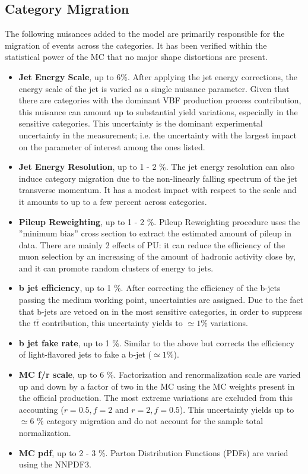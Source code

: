 \subsection{Category Migration}
The following nuisances added to the model are primarily responsible for the migration of events across the categories. It has been verified within the statistical power of the MC that no major shape distortions are present.
\begin{itemize}
    \item {\bf Jet Energy Scale}, up to 6\%. After applying the jet energy corrections, the energy scale of the jet is varied as a single nuisance parameter.
    Given that there are categories with the dominant VBF production process contribution, this nuisance can amount up to substantial yield variations, especially in the sensitive categories. This uncertainty is the dominant experimental uncertainty in the measurement; i.e. the uncertainty with the largest impact on the parameter of interest among the ones listed.
    \item {\bf Jet Energy Resolution}, up to 1 - 2 \%. The jet energy resolution can also induce category migration due to the non-linearly falling spectrum of the jet transverse momentum. It has a modest impact with respect to the scale and it amounts to up to a few percent across categories.
    \item {\bf Pileup Reweighting}, up to 1 - 2 \%. Pileup Reweighting procedure uses the ''minimum bias'' cross section to extract the estimated amount of pileup in data. There are mainly 2 effects of PU: it can reduce the efficiency of the muon selection by an increasing of the amount of hadronic activity close by, and it can promote random clusters of energy to jets.
    \item {\bf b jet efficiency}, up to 1 \%. After correcting the efficiency of the b-jets passing the medium working point, uncertainties are assigned. Due to the fact that b-jets are vetoed on in the most sensitive categories, in order to suppress the {$t\bar{t}$} contribution, this uncertainty yields to $\simeq 1 \%$ variations.
    \item {\bf b jet fake rate}, up to 1 \%. Similar to the above but corrects the efficiency of light-flavored jets to fake a b-jet ($\simeq 1 \%$).
    \item {\bf MC f/r scale}, up to 6 \%. Factorization and renormalization scale are varied up and down by a factor of two in the MC using the MC weights present in the official production. The most extreme variations are excluded from this accounting ($r=0.5,f=2$ and $r=2,f=0.5$). This uncertainty yields up to $\simeq 6$ \% category migration and do not account for the sample total normalization.
    \item {\bf MC pdf}, up to 2 - 3 \%. Parton Distribution Functions (PDFs) are varied using the NNPDF3.
\end{itemize}
